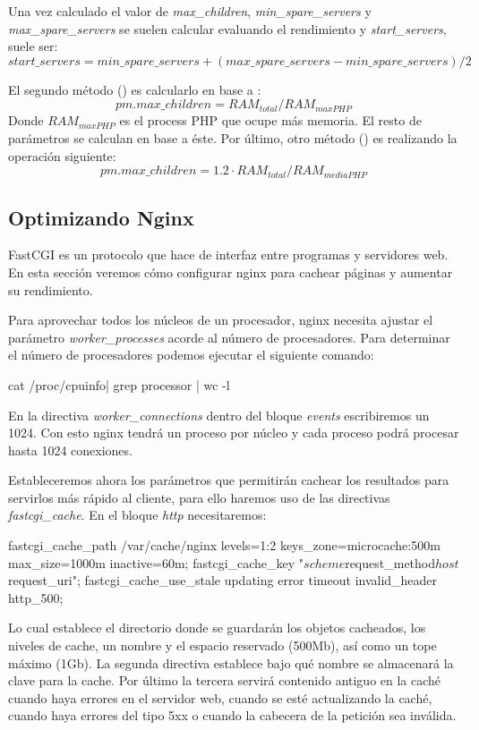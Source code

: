Una vez calculado el valor de \emph{max\_children}, \emph{min\_spare\_servers} y
\emph{max\_spare\_servers}  se suelen calcular evaluando el rendimiento y \emph{start\_servers},
suele ser:
\begin{equation}
    start\_servers = min\_spare\_servers + (max\_spare\_servers - min\_spare\_servers) / 2
\end{equation}

El segundo método (\cite{pools2}) es calcularlo en base a :
\begin{equation}
    pm.max\_children = RAM_{total} / RAM_{maxPHP}
\end{equation}
Donde $RAM_{maxPHP}$ es el process PHP que ocupe más memoria. El resto de
parámetros se calculan en base a éste.
Por último, otro método (\cite{pools3}) es realizando la operación siguiente:
\begin{equation}
    pm.max\_children = 1.2 \cdot RAM_{total}/RAM_{mediaPHP}
\end{equation}

\subsection{Optimizando Nginx} %
FastCGI es un protocolo que hace de interfaz entre programas y servidores web.
En esta sección veremos cómo configurar nginx para cachear páginas y aumentar
su rendimiento.

Para aprovechar todos los núcleos de un procesador, nginx necesita ajustar
el parámetro \emph{worker\_processes} acorde al número de procesadores. Para
determinar el número de procesadores podemos ejecutar el siguiente comando:
\begin{bashcode}
cat /proc/cpuinfo| grep processor | wc -l
\end{bashcode}
En la directiva \emph{worker\_connections} dentro del bloque \emph{events} escribiremos
un 1024. Con esto nginx tendrá un proceso por núcleo y cada proceso podrá procesar hasta
1024 conexiones.

Estableceremos ahora los parámetros que permitirán cachear los resultados
para servirlos más rápido al cliente, para ello haremos uso de las directivas
\emph{fastcgi\_cache}. En el bloque \emph{http} necesitaremos:
\begin{bashcode}
fastcgi_cache_path /var/cache/nginx levels=1:2 keys_zone=microcache:500m max_size=1000m inactive=60m;
fastcgi_cache_key "$scheme$request_method$host$request_uri";
fastcgi_cache_use_stale updating error timeout invalid_header http_500;
\end{bashcode}
Lo cual establece el directorio donde se guardarán los objetos cacheados,
los niveles de cache, un nombre y el espacio reservado (500Mb), así como
un tope máximo (1Gb). La segunda directiva establece bajo qué nombre se
almacenará la clave para la cache. Por último la tercera servirá contenido
antiguo en la caché cuando haya errores en el servidor web, cuando se esté
actualizando la caché, cuando haya errores del tipo 5xx o cuando la cabecera
de la petición sea inválida.

